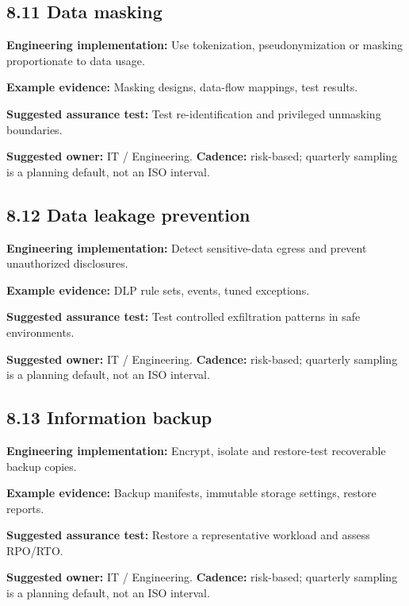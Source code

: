 \documentclass[11pt,letterpaper]{article}
\begin{document}
\subsection{8.11 Data masking}
\textbf{Engineering implementation:} Use tokenization, pseudonymization or masking proportionate to data usage.\par
\textbf{Example evidence:} Masking designs, data-flow mappings, test results.\par
\textbf{Suggested assurance test:} Test re-identification and privileged unmasking boundaries.\par
\textbf{Suggested owner:} IT / Engineering. \textbf{Cadence:} risk-based; quarterly sampling is a planning default, not an ISO interval.\par
{}
\subsection{8.12 Data leakage prevention}
\textbf{Engineering implementation:} Detect sensitive-data egress and prevent unauthorized disclosures.\par
\textbf{Example evidence:} DLP rule sets, events, tuned exceptions.\par
\textbf{Suggested assurance test:} Test controlled exfiltration patterns in safe environments.\par
\textbf{Suggested owner:} IT / Engineering. \textbf{Cadence:} risk-based; quarterly sampling is a planning default, not an ISO interval.\par
{}
\subsection{8.13 Information backup}
\textbf{Engineering implementation:} Encrypt, isolate and restore-test recoverable backup copies.\par
\textbf{Example evidence:} Backup manifests, immutable storage settings, restore reports.\par
\textbf{Suggested assurance test:} Restore a representative workload and assess RPO/RTO.\par
\textbf{Suggested owner:} IT / Engineering. \textbf{Cadence:} risk-based; quarterly sampling is a planning default, not an ISO interval.\par
{}
\end{document}

